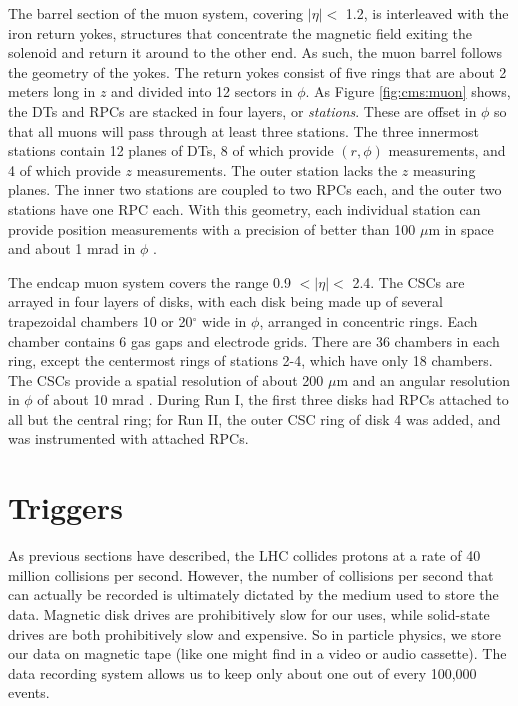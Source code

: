 The barrel section of the muon system, covering $|\eta| <$ 1.2, is
interleaved with the iron return yokes, structures that concentrate
the magnetic field exiting the solenoid and return it around to the
other end. As such, the muon barrel follows the geometry of the
yokes. The return yokes consist of five rings that are about 2 meters long
in $z$ and divided into 12 sectors in $\phi$. As Figure \ref{fig:cms:muon} shows,
the DTs and RPCs are stacked in four layers, or \emph{stations}. These
are offset in $\phi$ so that all muons will pass through at least
three stations. The three innermost stations contain 12 planes of DTs, 8 of
which provide $(r,\phi)$ measurements, and 4 of which provide $z$
measurements. The outer station lacks the $z$ measuring planes. The
inner two stations are coupled to two RPCs each, and the outer two
stations have one RPC each. With this geometry, each individual
station can provide position measurements with a precision of better
than 100 $\mu$m in space and about 1 mrad in $\phi$ \cite{tdr}.

The endcap muon system covers the range 0.9 $< |\eta| <$ 2.4. The
CSCs are arrayed in four layers of disks, with each disk being made up
of several trapezoidal chambers 10 or 20$^\circ$ wide in $\phi$,
arranged in concentric rings. Each chamber contains 6 gas gaps and
electrode grids. There are 36 chambers in each ring, except the
centermost rings of stations 2-4, which have only 18 chambers. The
CSCs provide a spatial resolution of about 200 $\mu$m and an angular
resolution in $\phi$ of about 10 mrad \cite{tdr}. During Run I, the
first three disks had RPCs attached to all but the central ring; for
Run II, the outer CSC ring of disk 4 was added, and was instrumented
with attached RPCs.


\section{Triggers}
\label{sec:cms:triggers}

As previous sections have described, the LHC collides protons at a
rate of 40 million collisions per second. However, the number of
collisions per second that can actually be recorded is ultimately
dictated by the medium used to store the data. Magnetic disk drives
are prohibitively slow for our uses, while solid-state
drives are both prohibitively slow and expensive. So in particle
physics, we store our data
on magnetic tape (like one might find in a video or audio
cassette). The data recording system allows us to keep only about one
out of every 100,000 events.

